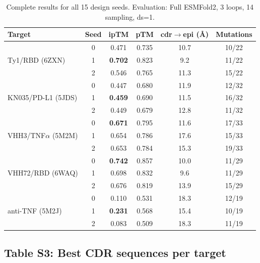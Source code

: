 \documentclass{nature}
\begin{document}
\begin{table}[htbp]
\centering
\caption{Complete results for all 15 design seeds. Evaluation: Full ESMFold2, 3 loops, 14 sampling, ds=1.}
\label{tab:all_results}
\begin{tabular}{lccccc}
\toprule
Target & Seed & ipTM & pTM & cdr$\to$epi (\AA) & Mutations \\
\midrule
\multirow{3}{*}{Ty1/RBD (6ZXN)} & 0 & 0.471 & 0.735 & 10.7 & 10/22 \\
                                 & 1 & \textbf{0.702} & 0.823 & 9.2 & 11/22 \\
                                 & 2 & 0.546 & 0.765 & 11.3 & 15/22 \\
\midrule
\multirow{3}{*}{KN035/PD-L1 (5JDS)} & 0 & 0.447 & 0.680 & 11.9 & 12/32 \\
                                    & 1 & \textbf{0.459} & 0.690 & 11.5 & 16/32 \\
                                    & 2 & 0.449 & 0.679 & 12.8 & 11/32 \\
\midrule
\multirow{3}{*}{VHH3/TNF$\alpha$ (5M2M)} & 0 & \textbf{0.671} & 0.795 & 11.6 & 17/33 \\
                                       & 1 & 0.654 & 0.786 & 17.6 & 15/33 \\
                                       & 2 & 0.653 & 0.784 & 15.3 & 19/33 \\
\midrule
\multirow{3}{*}{VHH72/RBD (6WAQ)} & 0 & \textbf{0.742} & 0.857 & 10.0 & 11/29 \\
                                   & 1 & 0.698 & 0.832 & 9.6 & 11/29 \\
                                   & 2 & 0.676 & 0.819 & 13.9 & 15/29 \\
\midrule
\multirow{3}{*}{anti-TNF (5M2J)} & 0 & 0.110 & 0.531 & 18.3 & 12/19 \\
                                  & 1 & \textbf{0.231} & 0.568 & 15.4 & 10/19 \\
                                  & 2 & 0.083 & 0.509 & 18.3 & 11/19 \\
\bottomrule
\end{tabular}
\end{table}

\subsection{Table S3: Best CDR sequences per target}
\end{document}
